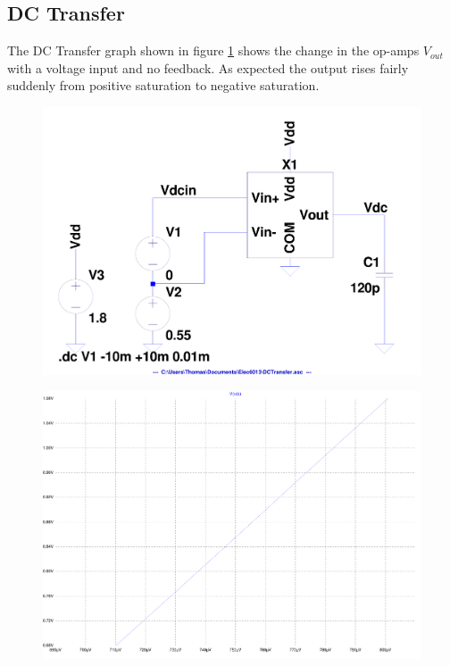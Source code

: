 \subsection{DC Transfer}

The DC Transfer graph shown in figure \ref{fig:DCtrans} shows the change in the op-amps $V_{out}$ with a voltage input and no feedback.
As expected the output rises fairly suddenly from positive saturation to negative saturation.

\begin{figure}[H]
	\centering
	\includegraphics[width=\textwidth]{./images/DCTransfer-out.pdf}
	\caption{}
	\label{fig:DCtrans}
\end{figure}



\begin{figure}[H]
	\centering
	\includegraphics[width=\textwidth]{./images/DCTransfer-zoom.pdf}
	\caption{}
	\label{fig:DCzoom}
\end{figure}

